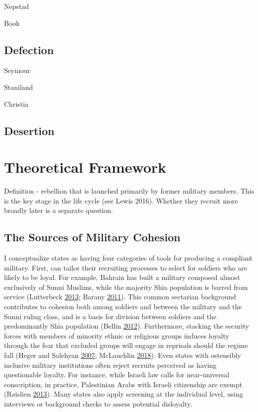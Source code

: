 \documentclass[12pt,]{article}
\begin{document}
Nepstad

Book

\hypertarget{defection}{%
\subsection{Defection}\label{defection}}

Seymour

Staniland

Christia

\hypertarget{desertion}{%
\subsection{Desertion}\label{desertion}}

\hypertarget{theoretical-framework}{%
\section{Theoretical Framework}\label{theoretical-framework}}

Definition - rebellion that is launched primarily by former military members. This is the key stage in the life cycle (see Lewis 2016). Whether they recruit more broadly later is a separate question.

\hypertarget{the-sources-of-military-cohesion}{%
\subsection{The Sources of Military Cohesion}\label{the-sources-of-military-cohesion}}

I conceptualize states as having four categories of tools for producing a compliant military. First, can tailor their recruiting processes to select for soldiers who are likely to be loyal. For example, Bahrain has built a military composed almost exclusively of Sunni Muslims, while the majority Shia population is barred from service (Lutterbeck \protect\hyperlink{ref-Lutterbeck2013}{2013}; Barany \protect\hyperlink{ref-Barany2011}{2011}). This common sectarian background contributes to cohesion both among soldiers and between the military and the Sunni ruling class, and is a basis for division between soldiers and the predominantly Shia population (Bellin \protect\hyperlink{ref-Bellin2012}{2012}). Furthermore, stacking the security forces with members of minority ethnic or religious groups induces loyalty through the fear that excluded groups will engage in reprisals should the regime fall (Heger and Salehyan \protect\hyperlink{ref-Heger2007a}{2007}; McLauchlin \protect\hyperlink{ref-McLauchlin2018}{2018}). Even states with ostensibly inclusive military institutions often reject recruits perceived as having questionable loyalty. For instance, while Israeli law calls for near-universal conscription, in practice, Palestinian Arabs with Israeli citizenship are exempt (Røislien \protect\hyperlink{ref-Roislien2013}{2013}). Many states also apply screening at the individual level, using interviews or background checks to assess potential disloyalty.
\end{document}
